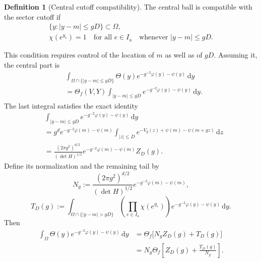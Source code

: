 \documentclass[10pt,reqno]{amsart}
\theoremstyle{definition}
\newtheorem{definition}{Definition}[section]
\theoremstyle{remark}
\numberwithin{equation}{section}
\numberwithin{figure}{section}
\newcommand{\dd}{\mathrm d}
\newcommand{\Ia}{I_{\mathrm a}}
\begin{document}
\begin{definition}[Central cutoff compatibility]
The central ball is compatible with the sector cutoff if
\begin{equation}\label{eq:central-cutoff-compatibility}
\begin{gathered}
\{y:|y-m|\le gD\}\subset\Omega,\\
\chi(e^{y_e})=1\quad\text{for all }e\in\Ia
\quad\text{whenever }|y-m|\le gD.
\end{gathered}
\end{equation}
\end{definition}
This condition requires control of the location of $m$ as well as of $gD$.
Assuming it, the central part is
\begin{equation}\label{eq:central-cutoff-removal}
\begin{aligned}
&\int_{\Omega\cap\{|y-m|\le gD\}}
\Theta(y)e^{-g^{-2}\varphi(y)-\psi(y)}\,\dd y\\
&=\Theta_f(V,Y)\int_{|y-m|\le gD}
e^{-g^{-2}\varphi(y)-\psi(y)}\,\dd y.
\end{aligned}
\end{equation}
The last integral satisfies the exact identity
\begin{equation}\label{eq:central-integral-normalization}
\begin{aligned}
&\int_{|y-m|\le gD}e^{-g^{-2}\varphi(y)-\psi(y)}\,\dd y\\
&=g^de^{-g^{-2}\varphi(m)-\psi(m)}
\int_{|z|\le D}e^{-V_g(z)+\psi(m)-\psi(m+gz)}\,\dd z\\
&=\frac{(2\pi g^2)^{d/2}}{(\det H)^{1/2}}
e^{-g^{-2}\varphi(m)-\psi(m)}Z_D(g).
\end{aligned}
\end{equation}
Define its normalization and the remaining tail by
\begin{equation}\label{eq:Ng-definition}
N_g:=\frac{(2\pi g^2)^{d/2}}{(\det H)^{1/2}}
e^{-g^{-2}\varphi(m)-\psi(m)},
\end{equation}
\begin{equation}\label{eq:TD-definition}
T_D(g):=\int_{\Omega\cap\{|y-m|>gD\}}
\left(\prod_{e\in\Ia}\chi(e^{y_e})\right)
e^{-g^{-2}\varphi(y)-\psi(y)}\,\dd y.
\end{equation}
Then
\begin{equation}\label{eq:full-sector-normalized}
\begin{aligned}
\int_\Omega\Theta(y)e^{-g^{-2}\varphi(y)-\psi(y)}\,\dd y
&=\Theta_f\bigl[N_gZ_D(g)+T_D(g)\bigr]\\
&=N_g\Theta_f\left[Z_D(g)+\frac{T_D(g)}{N_g}\right].
\end{aligned}
\end{equation}
\end{document}
